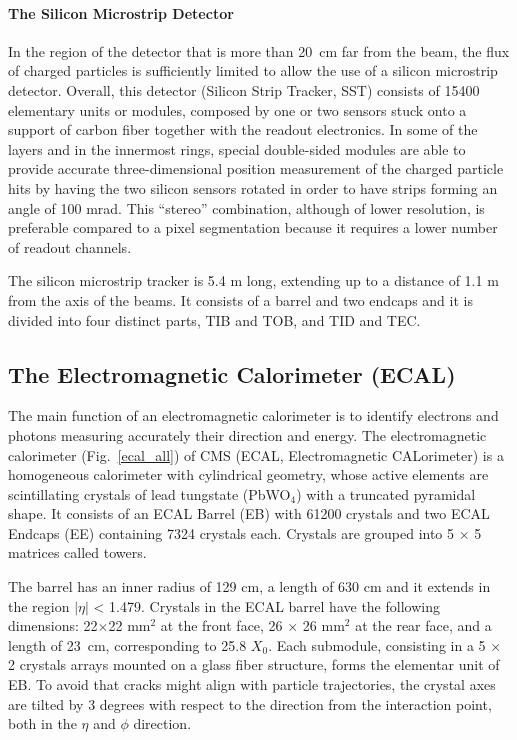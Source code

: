 \paragraph*{The Silicon Microstrip Detector} In the region of the detector that is more than 20~cm far from the beam, the flux of
charged particles is sufficiently limited to allow the use of a silicon microstrip detector. Overall, this detector (Silicon
Strip Tracker, SST) consists of 15400 elementary units or modules,
composed by one or two sensors stuck onto a support of carbon fiber together with the readout
electronics. In some of the layers and in the innermost rings, special
double-sided modules are able to provide accurate three-dimensional
position measurement of the charged particle hits by having the two silicon
sensors rotated in order to have strips forming an angle of 100 mrad. 
This “stereo” combination, although of lower resolution, is preferable
compared to a pixel segmentation because it requires a lower number of
readout channels.  

The
silicon microstrip tracker is 5.4 m long, extending up to a distance of 1.1 m from the axis
of the beams. It consists of a barrel and two endcaps and it is divided into four distinct
parts, TIB and TOB, and TID and TEC.


\subsection*{The Electromagnetic Calorimeter (ECAL)}
The main function of an electromagnetic calorimeter is to identify
electrons and photons measuring accurately their direction and energy. The electromagnetic calorimeter (Fig.~\ref{ecal_all}) of
CMS (ECAL, Electromagnetic CALorimeter)  is a homogeneous calorimeter with
cylindrical geometry, whose active elements are scintillating crystals of lead tungstate (PbWO$_4$)
with a truncated pyramidal shape. It consists of an ECAL Barrel (EB) with 61200 crystals
and two ECAL Endcaps (EE) containing 7324 crystals each.
Crystals are grouped into 5 × 5 matrices called towers.

The barrel has an inner radius of
129 cm, a length of 630 cm and it extends in the region $|\eta|$ < 1.479. Crystals in the ECAL
barrel have the following dimensions: 22$\times$22 mm$^2$ at the front face, 26 × 26 mm$^2$ at the
rear face, and a length of 23~cm, corresponding to 25.8 $X_0$. Each submodule, consisting
in a 5 × 2 crystals arrays mounted on a glass fiber structure, forms the elementar unit of
EB.
To avoid that cracks might align with
particle trajectories, the crystal axes are tilted by 3 degrees with respect to the direction from
the interaction point, both in the $\eta$ and $\phi$ direction.

